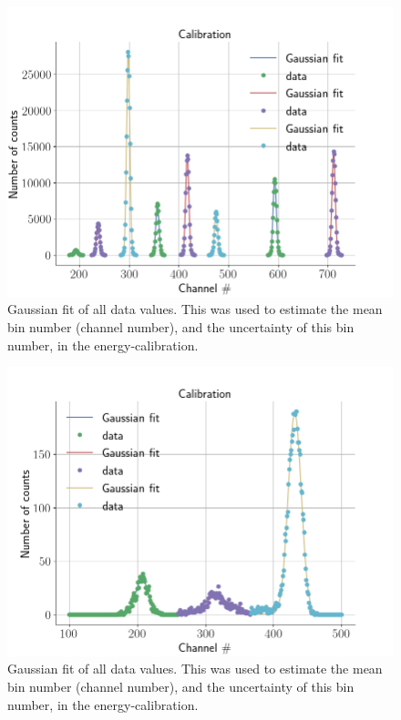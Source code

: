 \begin{figure}[h]
\centering
\includegraphics[width=0.99\columnwidth]{gaussian_fit}
\caption{Gaussian fit of all data values. This was used to estimate the mean
bin number (channel number), and the uncertainty of this bin number, in the
energy-calibration.}
\label{fig_gaussian_fit}
\end{figure}

\begin{figure}[h]
\centering
\includegraphics[width=0.99\columnwidth]{gaussian_fit2}
\caption{Gaussian fit of all data values. This was used to estimate the mean
bin number (channel number), and the uncertainty of this bin number, in the
energy-calibration.}
\label{fig_gaussian_fit2}
\end{figure}


